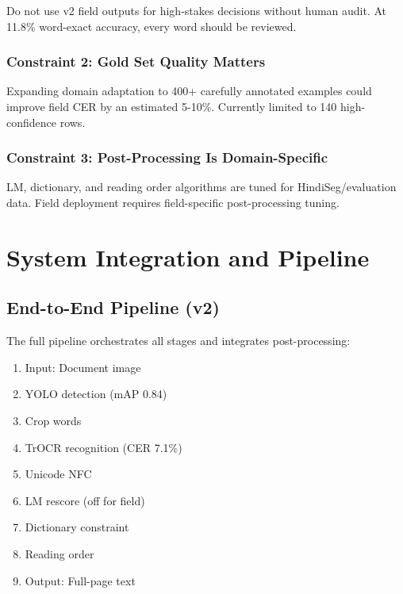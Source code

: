 \documentclass[14pt,a4paper]{article}
\begin{document}
Do not use v2 field outputs for high-stakes decisions without human audit. At 11.8\% word-exact accuracy, every word should be reviewed.

\subsubsection{Constraint 2: Gold Set Quality Matters}

Expanding domain adaptation to 400+ carefully annotated examples could improve field CER by an estimated 5-10\%. Currently limited to 140 high-confidence rows.

\subsubsection{Constraint 3: Post-Processing Is Domain-Specific}

LM, dictionary, and reading order algorithms are tuned for HindiSeg/evaluation data. Field deployment requires field-specific post-processing tuning.

\section{System Integration and Pipeline}

\subsection{End-to-End Pipeline (v2)}

The full pipeline orchestrates all stages and integrates post-processing:

\begin{enumerate}
    \item Input: Document image
    \item YOLO detection (mAP 0.84)
    \item Crop words
    \item TrOCR recognition (CER 7.1\%)
    \item Unicode NFC
    \item LM rescore (off for field)
    \item Dictionary constraint
    \item Reading order
    \item Output: Full-page text
\end{enumerate}
\end{document}
